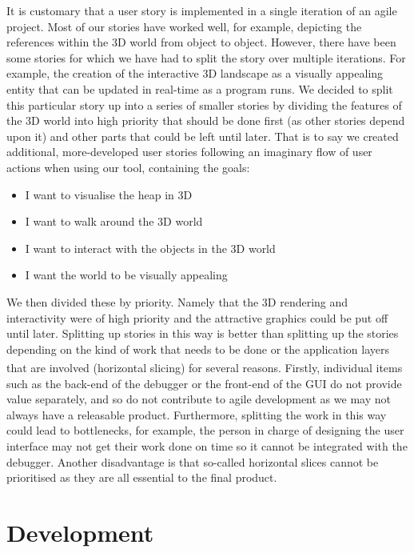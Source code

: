 \documentclass[10pt, a4paper]{article}
\begin{document}
It is customary that a user story is implemented in a single iteration of an agile project. Most of our stories have worked well, for example, depicting the references within the 3D world from object to object. However, there have been some stories for which we have had to split the story over multiple iterations. For example, the creation of the interactive 3D landscape as a visually appealing entity that can be updated in real-time as a program runs. We decided to split this particular story up into a series of smaller stories by dividing the features of the 3D world into high priority that should be done first (as other stories depend upon it) and other parts that could be left until later. That is to say we created additional, more-developed user stories following an imaginary flow of user actions when using our tool, containing the goals:
\begin{itemize}

  \item I want to visualise the heap in 3D
  \item I want to walk around the 3D world
  \item I want to interact with the objects in the 3D world
  \item I want the world to be visually appealing 

\end{itemize}
We then divided these by priority. Namely that the 3D rendering and interactivity were of high priority and the attractive graphics could be put off until later. Splitting up stories in this way is better than splitting up the stories depending on the kind of work that needs to be done or the application layers that are involved (horizontal slicing) for several reasons\textsuperscript{\cite{eight}}. Firstly, individual items such as the back-end of the debugger or the front-end of the GUI do not provide value separately, and so do not contribute to agile development as we may not always have a releasable product. Furthermore, splitting the work in this way could lead to bottlenecks, for example, the person in charge of designing the user interface may not get their work done on time so it cannot be integrated with the debugger. Another disadvantage is that so-called horizontal slices cannot be prioritised as they are all essential to the final product.  

\section{Development}
\end{document}
